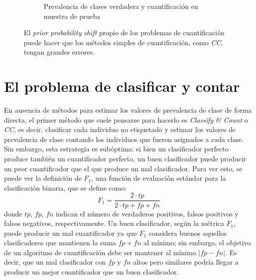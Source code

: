\begin{figure}[H]
\begin{subfigure}[t]{0.36\textwidth}
        \caption{Prevalencia de clases verdadera y cuantificación en muestra de
        prueba}\label{cambios:cuantificacion_tst}
    \end{subfigure}
    \caption{El {\it prior probability shift\/} propio de los problemas de
    cuantificación puede hacer que los métodos simples de cuantificación, como
    {\it CC}, tengan grandes errores.}\label{fig:cambios}
\end{figure}

\section{El problema de clasificar y contar}\label{problema:clasificar_y_contar}

En ausencia de métodos para estimar los valores de prevalencia de clase de forma
directa, el primer método que suele pensarse para hacerlo es {\it Classify \&
Count} o {\it CC}, es decir, clasificar cada individuo no etiquetado y estimar
los valores de prevalencia de clase contando los individuos que fueron asignados
a cada clase. Sin embargo, esta estrategia es subóptima: si bien un clasificador
perfecto produce también un cuantificador perfecto, un buen clasificador puede
producir un peor cuantificador que el que produce un mal clasificador. Para ver
esto, se puede ver la definición de $F_1$, una función de evaluación estándar
para la clasificación binaria, que se define como:
\begin{equation}
    F_1 = \frac{2 \cdot tp}{2 \cdot tp + fp + fn}
\end{equation}
donde $tp$, $fp$, $fn$ indican el número de verdaderos positivos, falsos
positivos y falsos negativos, respectivamente. Un buen clasificador, según la
métrica $F_1$, puede producir un mal cuantificador ya que $F_1$ considera buenos
aquellos clasificadores que mantienen la suma $fp + fn$ al mínimo; sin embargo,
el objetivo de un algoritmo de cuantificación debe ser mantener al mínimo
$|fp-fn|$. Es decir, que un mal clasificador con $fp$ y  $fn$ altos pero
similares podría llegar a producir un mejor cuantificador que un buen
clasificador.

